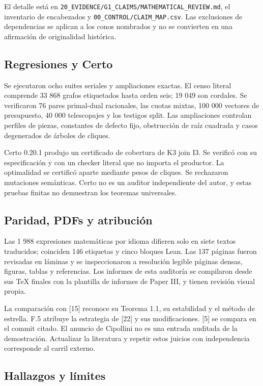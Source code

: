 El detalle está en
\texttt{20\_EVIDENCE/G1\_CLAIMS/MATHEMATICAL\_REVIEW.md}, el inventario
de encabezados y \texttt{00\_CONTROL/CLAIM\_MAP.csv}. Las exclusiones de
dependencias se aplican a los conos nombrados y no se convierten en una
afirmación de originalidad histórica.

\subsection{Regresiones y Certo}\label{regresiones-y-certo}

Se ejecutaron ocho suites seriales y ampliaciones exactas. El censo
literal comprende 33 868 grafos etiquetados hasta orden seis; 19 049 son
cordales. Se verificaron 76 pares primal-dual racionales, las cuotas
mixtas, 100 000 vectores de presupuesto, 40 000 telescopajes y los
testigos split. Las ampliaciones controlan perfiles de piezas,
constantes de defecto fijo, obstrucción de raíz cuadrada y casos
degenerados de árboles de cliques.

Certo 0.20.1 produjo un certificado de cobertura de K3 join I3. Se
verificó con su especificación y con un checker literal que no importa
el productor. La optimalidad se certificó aparte mediante pesos de
cliques. Se rechazaron mutaciones semánticas. Certo no es un auditor
independiente del autor, y estas pruebas finitas no demuestran los
teoremas universales.

\subsection{Paridad, PDFs y
atribución}\label{paridad-pdfs-y-atribuciuxf3n}

Las 1 988 expresiones matemáticas por idioma difieren solo en siete
textos traducidos; coinciden 146 etiquetas y cinco bloques Lean. Las 137
páginas fueron revisadas en láminas y se inspeccionaron a resolución
legible páginas densas, figuras, tablas y referencias. Los informes de
esta auditoría se compilaron desde sus TeX finales con la plantilla de
informes de Paper III, y tienen revisión visual propia.

La comparación con {[}15{]} reconoce su Teorema 1.1, su estabilidad y el
método de estrella. F.5 atribuye la estrategia de {[}22{]} y sus
modificaciones. {[}5{]} se compara en el commit citado. El anuncio de
Cipollini no es una entrada auditada de la demostración. Actualizar la
literatura y repetir estos juicios con independencia corresponde al
carril externo.

\subsection{Hallazgos y límites}\label{hallazgos-y-luxedmites}

